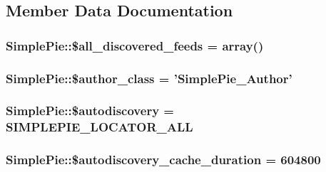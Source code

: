 \subsection{Member Data Documentation}
\hypertarget{class_simple_pie_af59339d23d7c0b6590395a26c9c60d37}{
\subsubsection[{\$all\-\_\-discovered\-\_\-feeds}]{\setlength{\rightskip}{0pt plus 5cm}Simple\-Pie\-::\$all\-\_\-discovered\-\_\-feeds = array()}}\label{class_simple_pie_af59339d23d7c0b6590395a26c9c60d37}
\hypertarget{class_simple_pie_aa4bb6b200f0727ec0723c20aee18eb2b}{
\subsubsection[{\$author\-\_\-class}]{\setlength{\rightskip}{0pt plus 5cm}Simple\-Pie\-::\$author\-\_\-class = '{\bf Simple\-Pie\-\_\-\-Author}'}}\label{class_simple_pie_aa4bb6b200f0727ec0723c20aee18eb2b}
\hypertarget{class_simple_pie_aad5f9f0285ed8c9e5559ece55d956878}{
\subsubsection[{\$autodiscovery}]{\setlength{\rightskip}{0pt plus 5cm}Simple\-Pie\-::\$autodiscovery = {\bf S\-I\-M\-P\-L\-E\-P\-I\-E\-\_\-\-L\-O\-C\-A\-T\-O\-R\-\_\-\-A\-L\-L}}}\label{class_simple_pie_aad5f9f0285ed8c9e5559ece55d956878}
\hypertarget{class_simple_pie_adb913d0675f05ed6d6a6ba988ba6c1b1}{
\subsubsection[{\$autodiscovery\-\_\-cache\-\_\-duration}]{\setlength{\rightskip}{0pt plus 5cm}Simple\-Pie\-::\$autodiscovery\-\_\-cache\-\_\-duration = 604800}}\label{class_simple_pie_adb913d0675f05ed6d6a6ba988ba6c1b1}
